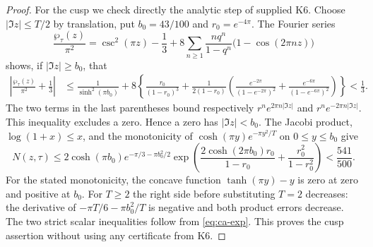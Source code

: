 \begin{proof}
For the cusp we check directly the analytic step of supplied K6.
Choose $|\Im z|\le T/2$ by translation, put $b_0=43/100$ and
$r_0=e^{-4\pi}$. The Fourier series
\[
 \frac{\wp_\tau(z)}{\pi^2}
 =\csc^2(\pi z)-\frac13
   +8\sum_{n\ge1}\frac{nq^n}{1-q^n}
          \bigl(1-\cos(2\pi nz)\bigr)
\]
shows, if $|\Im z|\ge b_0$, that
\begin{align*}
 \left|\frac{\wp_\tau(z)}{\pi^2}+\frac13\right|
 &\le \frac1{\sinh^2(\pi b_0)}
 +8\left\{\frac{r_0}{(1-r_0)^3}
 +\frac1{2(1-r_0)}
 \left(\frac{e^{-2\pi}}{(1-e^{-2\pi})^2}
       +\frac{e^{-6\pi}}{(1-e^{-6\pi})^2}\right)\right\}
 <\frac13.
\end{align*}
The two terms in the last parentheses bound respectively
$r^n e^{2\pi n|\Im z|}$ and $r^n e^{-2\pi n|\Im z|}$.
This inequality excludes a zero. Hence a zero has
$|\Im z|<b_0$. The Jacobi product, $\log(1+x)\le x$, and
the monotonicity of $\cosh(\pi y)e^{-\pi y^2/T}$ on
$0\le y\le b_0$ give
\[
 N(z,\tau)\le
 2\cosh(\pi b_0)e^{-\pi/3-\pi b_0^2/2}
 \exp\!\left(
 \frac{2\cosh(2\pi b_0)r_0}{1-r_0}
 +\frac{r_0^2}{1-r_0^2}\right)<\frac{541}{500}.
\]
For the stated monotonicity, the concave function
$\tanh(\pi y)-y$ is zero at zero and positive at $b_0$.
For $T\ge2$ the right side before substituting $T=2$ decreases:
the derivative of $-\pi T/6-\pi b_0^2/T$ is negative and
both product errors decrease. The two strict scalar inequalities
follow from \eqref{eq:ca-exp}. This proves the cusp assertion
without using any certificate from K6.
\end{proof}

